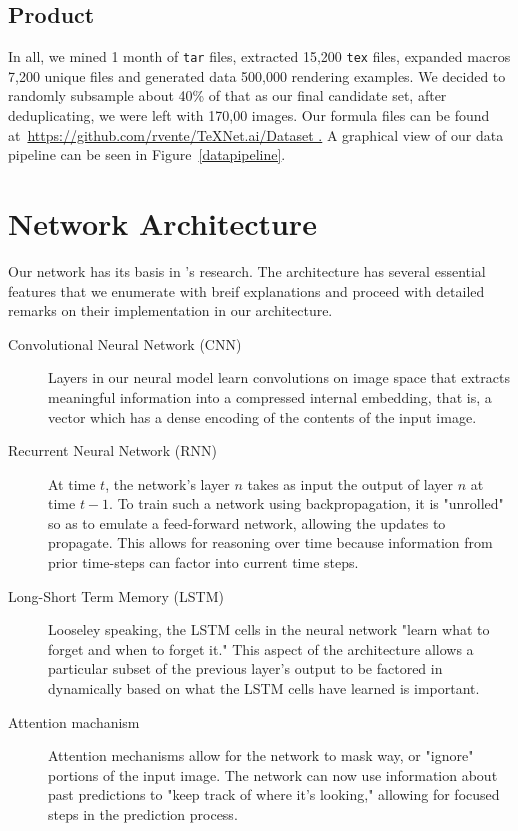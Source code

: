 \documentclass{article}
\begin{document}
\subsection{Product}

In all, we mined 1 month of \texttt{tar} files, extracted 15,200 \texttt{tex}
files, expanded macros 7,200 unique files and generated data 500,000 rendering
examples. We decided to randomly subsample about 40\% of that as our final
candidate set, after deduplicating, we were left with 170,00 images. Our formula
files can be found at~\url{https://github.com/rvente/TeXNet.ai/Dataset .} A
graphical view of our data pipeline can be seen in Figure~\ref{datapipeline}.

\section{Network Architecture}

Our network has its basis in \citeauthor{singh2018teaching}'s research. The
architecture has several essential features that we enumerate with breif
explanations and proceed with detailed remarks on their implementation in our
architecture.

\begin{description}
  \item[Convolutional Neural Network (CNN)] Layers in our neural model learn
  convolutions on image space that extracts meaningful information into a
  compressed internal embedding, that is, a vector which has a dense encoding of
  the contents of the input image.
  \item[Recurrent Neural Network (RNN)] At time $t$, the network's layer $n$ takes as
  input the output of layer $n$ at time $t-1$. To train such a network using
  backpropagation, it is "unrolled" so as to emulate a feed-forward network,
  allowing the updates to propagate. This allows for reasoning over time because
  information from prior time-steps can factor into current time steps.
  \item[Long-Short Term Memory (LSTM)] Looseley speaking, the LSTM cells in the
  neural network "learn what to forget and when to forget it." This aspect of
  the architecture allows a particular subset of the previous layer's output to
  be factored in dynamically based on what the LSTM cells have learned is
  important.
  \item[Attention machanism] Attention mechanisms allow for the network to mask
  way, or "ignore" portions of the input image. The network can now use
  information about past predictions to "keep track of where it's looking," allowing
  for focused steps in the prediction process.
\end{description}
\end{document}
